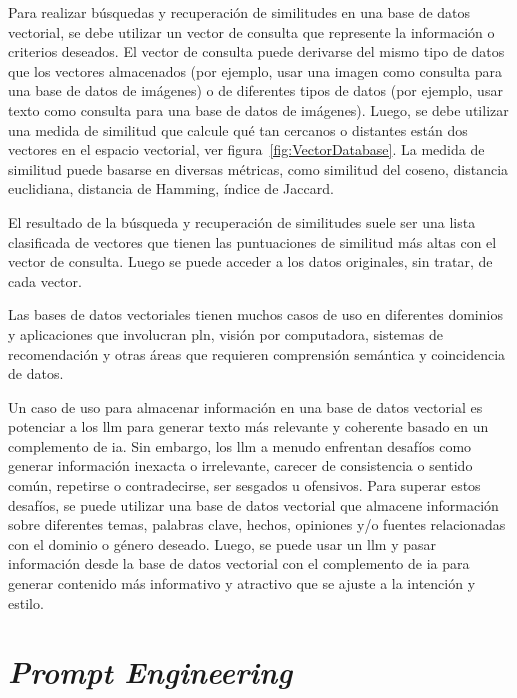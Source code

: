 Para realizar búsquedas y recuperación de similitudes en una base de datos vectorial, se debe utilizar un vector de consulta que represente la información o criterios deseados. El vector de consulta puede derivarse del mismo tipo de datos que los vectores almacenados (por ejemplo, usar una imagen como consulta para una base de datos de imágenes) o de diferentes tipos de datos (por ejemplo, usar texto como consulta para una base de datos de imágenes). Luego, se debe utilizar una medida de similitud que calcule qué tan cercanos o distantes están dos vectores en el espacio vectorial, ver figura~\ref{fig:VectorDatabase}. La medida de similitud puede basarse en diversas métricas, como similitud del coseno, distancia euclidiana, distancia de Hamming, índice de Jaccard.


El resultado de la búsqueda y recuperación de similitudes suele ser una lista clasificada de vectores que tienen las puntuaciones de similitud más altas con el vector de consulta. Luego se puede acceder a los datos originales, sin tratar, de cada vector.

Las bases de datos vectoriales tienen muchos casos de uso en diferentes dominios y aplicaciones que involucran \acrlong{pln}, visión por computadora, sistemas de recomendación y otras áreas que requieren comprensión semántica y coincidencia de datos.

Un caso de uso para almacenar información en una base de datos vectorial es potenciar a los \acrlong{llm} para generar texto más relevante y coherente basado en un complemento de \acrlong{ia}. Sin embargo, los \acrshort{llm} a menudo enfrentan desafíos como generar información inexacta o irrelevante, carecer de consistencia o sentido común, repetirse o contradecirse, ser sesgados u ofensivos. Para superar estos desafíos, se puede utilizar una base de datos vectorial que almacene información sobre diferentes temas, palabras clave, hechos, opiniones y/o fuentes relacionadas con el dominio o género deseado. Luego, se puede usar un \acrlong{llm} y pasar información desde la base de datos vectorial con el complemento de \acrlong{ia} para generar contenido más informativo y atractivo que se ajuste a la intención y estilo.

\section{\textit{Prompt Engineering}}

